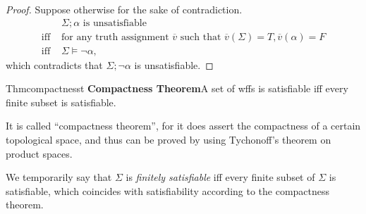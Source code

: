 \begin{proof}
  Suppose otherwise for the sake of contradiction.
  \begin{align*}
                & \Sigma;\alpha\text{ is unsatisfiable } \\\text{iff }&\text{for any truth assignment $\overline{v}$ such that $\overline{v}(\Sigma)=T, \overline{v}(\alpha)=F$} \\
    \text{iff } & \Sigma\vDash\neg \alpha,
  \end{align*}
  which contradicts that $\Sigma;\neg\alpha$ is unsatisfiable.
\end{proof}


\begin{reference}{Thm}{compactnesst}
  \textbf{Compactness Theorem}\quad A set of wffs is satisfiable iff every finite subset is satisfiable.
\end{reference}

It is called ``compactness theorem'', for it does assert the compactness of a certain topological space, and thus can be proved by using Tychonoff’s theorem on product spaces.


We temporarily say that $\Sigma$ is \textit{finitely satisfiable} iff every finite subset of $\Sigma$ is satisfiable, which coincides with satisfiability according to the compactness theorem.

